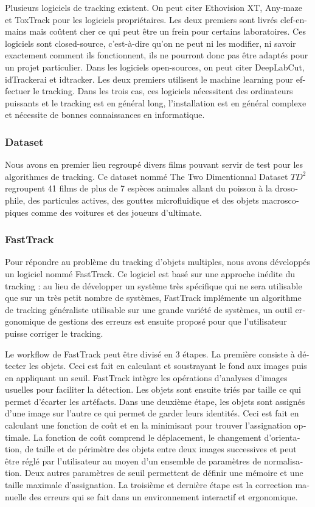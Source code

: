 \begin{otherlanguage}{french}
Plusieurs logiciels de tracking existent. On peut citer Ethovision XT, Any-maze et ToxTrack pour les logiciels propriétaires. Les deux premiers sont livrés clef-en-mains mais coûtent cher ce qui peut être un frein pour certains laboratoires. Ces logiciels sont closed-source, c’est-à-dire qu'on ne peut ni les modifier, ni savoir exactement comment ils fonctionnent, ils ne pourront donc pas être adaptés pour un projet particulier. Dans les logiciels open-sources, on peut citer DeepLabCut, idTrackerai et idtracker. Les deux premiers utilisent le machine learning pour effectuer le tracking. Dans les trois cas, ces logiciels nécessitent des ordinateurs puissants et le tracking est en général long, l'installation est en général complexe et nécessite de bonnes connaissances en informatique.

\subsubsection*{Dataset}
Nous avons en premier lieu regroupé divers films pouvant servir de test pour les algorithmes de tracking. Ce dataset nommé The Two Dimentionnal Dataset $TD^2$ regroupent 41 films de plus de 7 espèces animales allant du poisson à la drosophile, des particules actives, des gouttes microfluidique et des objets macroscopiques comme des voitures et des joueurs d'ultimate.

\subsubsection*{FastTrack}
Pour répondre au problème du tracking d'objets multiples, nous avons développés un logiciel nommé FastTrack. Ce logiciel est basé sur une approche inédite du tracking : au lieu de développer un système très spécifique qui ne sera utilisable que sur un très petit nombre de systèmes, FastTrack implémente un algorithme de tracking généraliste utilisable sur une grande variété de systèmes, un outil ergonomique de gestions des erreurs est ensuite proposé pour que l'utilisateur puisse corriger le tracking.

Le workflow de FastTrack peut être divisé en 3 étapes. La première consiste à détecter les objets. Ceci est fait en calculant et soustrayant le fond aux images puis en appliquant un seuil. FastTrack intègre les opérations d'analyses d'images usuelles pour faciliter la détection. Les objets sont ensuite triés par taille ce qui permet d'écarter les artéfacts. Dans une deuxième étape, les objets sont assignés d'une image sur l'autre ce qui permet de garder leurs identités. Ceci est fait en calculant une fonction de coût et en la minimisant pour trouver l'assignation optimale. La fonction de coût comprend le déplacement, le changement d'orientation, de taille et de périmètre des objets entre deux images successives et peut être réglé par l'utilisateur au moyen d'un ensemble de paramètres de normalisation. Deux autres paramètres de seuil permettent de définir une mémoire et une taille maximale d'assignation. La troisième et dernière étape est la correction manuelle des erreurs qui se fait dans un environnement interactif et ergonomique.


\end{otherlanguage}
